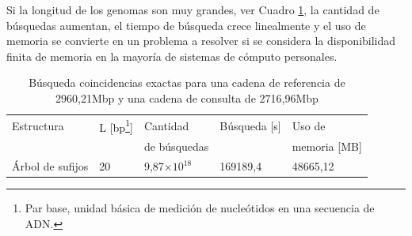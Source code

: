 \documentclass[12pt,a4paper]{article}
\providecommand{\e}[1]{\ensuremath{\times 10^{#1}}}
\begin{document}
Si la longitud de los genomas son muy grandes, ver Cuadro \ref{tab:buscar3}, 
la cantidad de búsquedas aumentan, el tiempo de búsqueda
crece linealmente y el uso de memoria se convierte en un problema a resolver si
se considera la disponibilidad finita de memoria en la mayoría de sistemas de
cómputo personales.\\
\begin{table}[ h!]
  \begin{small}
    \begin{center}
      \begin{tabular}{lllll}
        Estructura & L [bp\footnote{Par base, unidad básica de medición de nucleótidos en una secuencia de ADN.}] & Cantidad  & Búsqueda [s] & Uso de\\
        & & de búsquedas & & memoria [MB]\\
        \hline
        Árbol de sufijos & 20 & 9,87\e{18}  & 169189,4 & 48665,12\\
        \hline
      \end{tabular}
    \end{center}
  \end{small}
  \caption{Búsqueda coincidencias exactas para una cadena de referencia de 
  2960,21Mbp y una cadena de consulta de 2716,96Mbp}
  \label{tab:buscar3}
\end{table}
\end{document}
